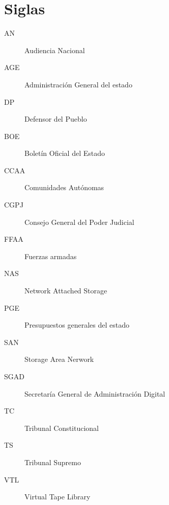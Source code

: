 \section{Siglas}
\noindent
\begin{description}
    \item[AN] Audiencia Nacional
    \item[AGE] Administración General del estado
    \item[DP] Defensor del Pueblo 
    \item[BOE] Boletín Oficial del Estado
    \item[CCAA] Comunidades Autónomas
    \item[CGPJ] Consejo General del Poder Judicial
    \item[FFAA] Fuerzas armadas
    \item[NAS] Network Attached Storage
    \item[PGE] Presupuestos generales del estado
    \item[SAN] Storage Area Nerwork
    \item[SGAD] Secretaría General de Administración Digital 
    \item[TC] Tribunal Constitucional
    \item[TS] Tribunal Supremo
    \item[VTL] Virtual Tape Library
\end{description}

